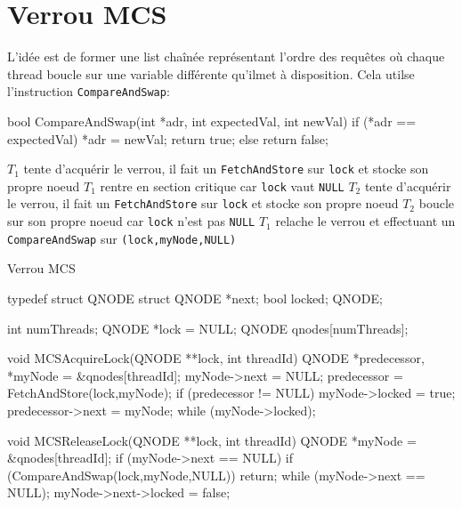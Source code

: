 \documentclass[11pt,a4paper]{report}
\begin{document}
\section{Verrou MCS} %
\label{sec:Verrou MCS}

L'idée est de former une list chaînée représentant l'ordre des requêtes où chaque thread boucle sur une variable différente qu'ilmet à disposition. Cela utilse l'instruction \texttt{CompareAndSwap}:

\begin{ccode}
    bool CompareAndSwap(int *adr, int expectedVal, int newVal)
    {
        if (*adr == expectedVal)
        {
            *adr = newVal;
            return true;
        }
        else
            return false;
    }
\end{ccode}

\begin{algorithm}[h] %
    $T_1$ tente d'acquérir le verrou, il fait un \texttt{FetchAndStore} sur \texttt{lock} et stocke son propre noeud\;
    $T_1$ rentre en section critique car \texttt{lock} vaut \texttt{NULL}\;
    $T_2$ tente d'acquérir le verrou, il fait un \texttt{FetchAndStore} sur \texttt{lock} et stocke son propre noeud\;
    $T_2$ boucle sur son propre noeud car \texttt{lock} n'est pas \texttt{NULL}\;
    $T_1$ relache le verrou et effectuant un \texttt{CompareAndSwap} sur \texttt{(lock,myNode,NULL)}\;
    \caption{Verrou MCS}
    \label{algo:verrou-mcs}
\end{algorithm} %

\begin{ccode}
    typedef struct QNODE
    {
        struct QNODE *next;
        bool locked;
    } QNODE;

    int numThreads;
    QNODE *lock = NULL;
    QNODE qnodes[numThreads];

    void MCSAcquireLock(QNODE **lock, int threadId)
    {
        QNODE *predecessor, *myNode = &qnodes[threadId];
        myNode->next = NULL;
        predecessor = FetchAndStore(lock,myNode);
        if (predecessor != NULL)
        {
            myNode->locked = true; predecessor->next = myNode;
            while (myNode->locked);
        }
    }

    void MCSReleaseLock(QNODE **lock, int threadId)
    {
        QNODE *myNode = &qnodes[threadId];
        if (myNode->next == NULL)
        {
            if (CompareAndSwap(lock,myNode,NULL))
                return;
            while (myNode->next == NULL);
        }
        myNode->next->locked = false;
    } 
\end{ccode}
\end{document}

